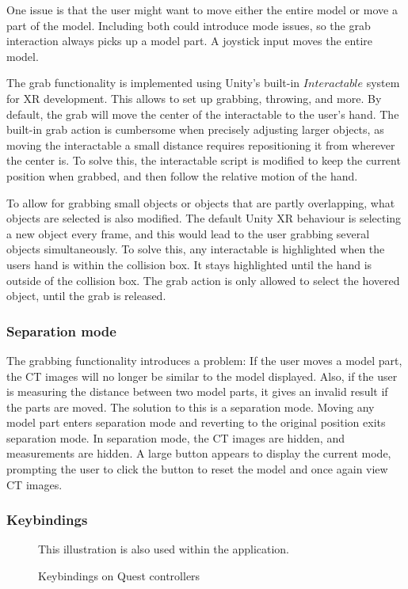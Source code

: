 \documentclass[a4paper]{report}
\begin{document}
One issue is that the user might want to move either the entire model or move a part of the model. Including both could introduce mode issues\cite{nngroup}, so the grab interaction always picks up a model part. A joystick input moves the entire model.

The grab functionality is implemented using Unity's built-in $Interactable$ system for XR\cite{noauthor_xr_nodate} development. This allows to set up grabbing, throwing, and more. 
By default, the grab will move the center of the interactable to the user's hand. The built-in grab action is cumbersome when precisely adjusting larger objects, as moving the interactable a small distance requires repositioning it from wherever the center is. 
To solve this, the interactable script is modified to keep the current position when grabbed, and then follow the relative motion of the hand.

To allow for grabbing small objects or objects that are partly overlapping, what objects are selected is also modified. The default Unity XR behaviour is selecting a new object every frame, and this would lead to the user grabbing several objects simultaneously. To solve this, any interactable is highlighted when the users hand is within the collision box. It stays highlighted until the hand is outside of the collision box. The grab action is only allowed to select the hovered object, until the grab is released.


\subsubsection{Separation mode}
The grabbing functionality introduces a problem: If the user moves a model part, the CT images will no longer be similar to the model displayed. Also, if the user is measuring the distance between two model parts, it gives an invalid result if the parts are moved. 
The solution to this is a separation mode. Moving any model part enters separation mode and reverting to the original position exits separation mode. In separation mode, the CT images are hidden, and measurements are hidden. A large button appears to display the current mode, prompting the user to click the button to reset the model and once again view CT images.

\subsubsection{Keybindings}

\begin{figure}[h!]
    \centering
	\hfill
  \caption{Keybindings on Quest controllers}
  \small
  This illustration is also used within the application.
\end{figure}
\end{document}
